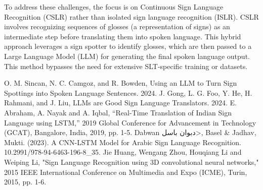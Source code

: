 \documentclass[conference]{IEEEtran}
\begin{document}
To address these challenges, the focus is on Continuous Sign Language Recognition (CSLR) rather than isolated sign language recognition (ISLR). CSLR involves recognizing sequences of glosses (a representation of signs) as an intermediate step before translating them into spoken language. This hybrid approach leverages a sign spotter to identify glosses, which are then passed to a Large Language Model (LLM) for generating the final spoken language output. This method bypasses the need for extensive SLT-specific training or datasets.

\begin{thebibliography}{00}
 O. M. Sincan, N. C. Camgoz, and R. Bowden, Using an LLM to Turn
Sign Spottings into Spoken Language Sentences. 2024.
 J. Gong, L. G. Foo, Y. He, H. Rahmani, and J. Liu, LLMs are Good Sign Language Translators. 2024.
 E. Abraham, A. Nayak and A. Iqbal, ``Real-Time Translation of Indian Sign Language using LSTM,'' 2019 Global Conference for Advancement in Technology (GCAT), Bangalore, India, 2019, pp. 1-5.
 Dabwan \<دبوان باسل>, Basel \& Jadhav, Mukti. (2023). A CNN-LSTM Model for Arabic Sign Language Recognition. 10.2991/978-94-6463-196-8\_35.
 Jie Huang, Wengang Zhou, Houqiang Li and Weiping Li, "Sign Language Recognition using 3D convolutional neural networks," 2015 IEEE
International Conference on Multimedia and Expo (ICME), Turin, 2015,
pp. 1-6.
\end{thebibliography}
\vspace{12pt}
\end{document}
